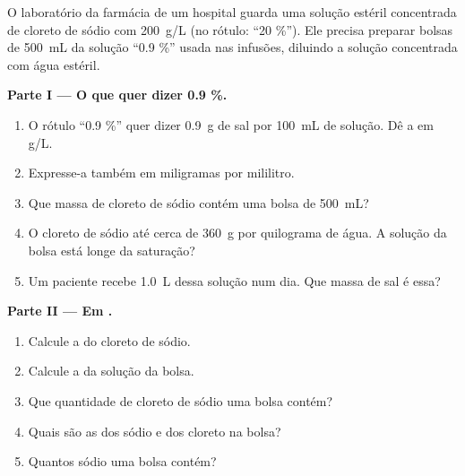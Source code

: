\begin{problem}
\label{pb:g10:concentration-and-dilution:1}
O laboratório da farmácia de um hospital guarda uma solução estéril
concentrada de cloreto de sódio com \qty{200}{g/L} (no rótulo: ``20
\%''). Ele precisa preparar bolsas de \qty{500}{mL} da solução ``0.9 \%''
usada nas infusões, diluindo a solução concentrada com água estéril.

\medskip
\noindent\textbf{Parte I --- O que quer dizer 0.9 \%.}
\begin{enumerate}
  \item O rótulo ``0.9 \%'' quer dizer \qty{0.9}{g} de sal por
        \qty{100}{mL} de solução. Dê a  em
        \si{g/L}.
  \item Expresse-a também em miligramas por mililitro.
  \item Que massa de cloreto de sódio contém uma bolsa de
        \qty{500}{mL}?
  \item O cloreto de sódio  até cerca de \qty{360}{g} por
        quilograma de água. A solução da bolsa está longe da saturação?
  \item Um paciente recebe \qty{1.0}{L} dessa solução num dia. Que massa
        de sal é essa?
\end{enumerate}

\medskip
\noindent\textbf{Parte II --- Em .}
\begin{enumerate}[resume]
  \item Calcule a  do cloreto de sódio.
  \item Calcule a  da solução da bolsa.
  \item Que quantidade de cloreto de sódio uma bolsa contém?
  \item Quais são as  dos  sódio e dos 
        cloreto na bolsa?
  \item Quantos  sódio uma bolsa contém?
\end{enumerate}


\end{problem}
